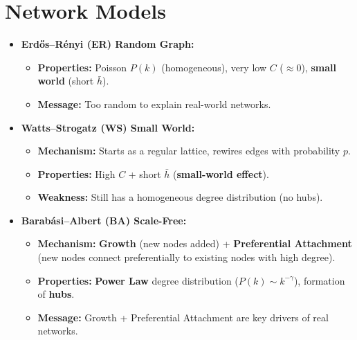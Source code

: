 \documentclass{report}
\begin{document}
\section*{Network Models}
\begin{itemize}
    \item \textbf{Erdős–Rényi (ER) Random Graph:}
    \begin{itemize}
        \item \textbf{Properties:} Poisson $P(k)$ (homogeneous), very low $C$ ($\approx 0$), \textbf{small world} (short $\bar{h}$).
        \item \textbf{Message:} Too random to explain real-world networks.
    \end{itemize}
    \item \textbf{Watts–Strogatz (WS) Small World:}
    \begin{itemize}
        \item \textbf{Mechanism:} Starts as a regular lattice, rewires edges with probability $p$.
        \item \textbf{Properties:} High $C$ + short $\bar{h}$ (\textbf{small-world effect}).
        \item \textbf{Weakness:} Still has a homogeneous degree distribution (no hubs).
    \end{itemize}
    \item \textbf{Barabási–Albert (BA) Scale-Free:}
    \begin{itemize}
        \item \textbf{Mechanism:} \textbf{Growth} (new nodes added) + \textbf{Preferential Attachment} (new nodes connect preferentially to existing nodes with high degree).
        \item \textbf{Properties:} \textbf{Power Law} degree distribution ($P(k) \sim k^{-\gamma}$), formation of \textbf{hubs}.
        \item \textbf{Message:} Growth + Preferential Attachment are key drivers of real networks.
    \end{itemize}
\end{itemize}
\end{document}
